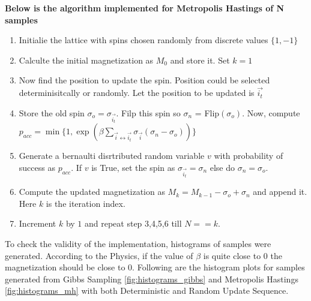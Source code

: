 \documentclass[11pt]{article}
\begin{document}
\noindent \textbf{Below is the algorithm implemented for Metropolis Hastings of N samples}
\begin{enumerate}
    \item Initialie the lattice with spins chosen randomly from discrete values $\{1, -1\}$
    \item Calculte the initial magnetization as $M_{0}$ and store it. Set $k = 1$
    \item Now find the position to update the spin. Position could be selected determinisitcally or randomly. Let the position to be updated is $\overrightarrow{i_{t}}$
    \item Store the old spin $\sigma_{o} = \sigma_{\overrightarrow{i_{t}}}$. Filp this spin so $\sigma_{n}$ = Flip$(\sigma_{o})$. 
	Now, compute $p_{acc} = \min\{1, \exp{\left( \beta \sum_{{\overrightarrow{i}} \leftrightarrow \overrightarrow{i_{t}}} \sigma_{\overrightarrow{i}} (\sigma_n - \sigma_o) \right)}\}$
    \item Generate a bernaulti disrtributed random variable $v$ with probability of success as $p_{acc}$. If $v$ is True, set the spin as $\sigma_{\overrightarrow{i_{t}}} = \sigma_n$ else do $\sigma_n = \sigma_o$.
    \item Compute the updated magnetization as $M_k = M_{k - 1} - \sigma_o + \sigma_n$ and append it. Here $k$ is the iteration index.
    \item Increment $k$ by $1$ and repeat step 3,4,5,6 till $N == k$.
\end{enumerate}

\noindent To check the validity of the implementation, histograms of samples were generated. According to the Physics, if the value of $\beta$ is quite close to $0$ the magnetization should be close to $0$.
Following are the histogram plots for samples generated from Gibbs Sampling \ref{fig:histograms_gibbs} and Metropolis Hastings \ref{fig:histograms_mh} with both Deterministic and Random Update Sequence.

\end{document}
